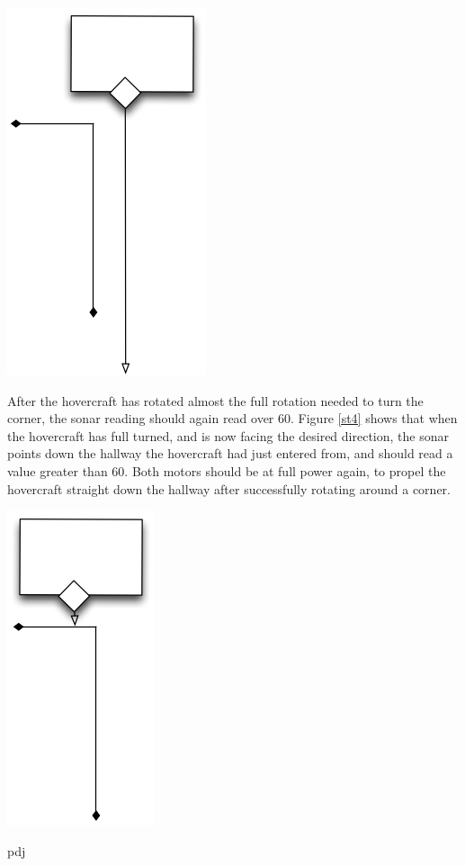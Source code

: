 \begin{center}
 \includegraphics[scale=0.5]{imageSources/sonarturn4.png}
\end{center}
\label{st4}

After the hovercraft has rotated almost the full rotation needed to turn the corner, the sonar reading should again read over 60. Figure \ref{st4} shows that when the hovercraft has full turned, and is now facing the desired direction, the sonar points down the hallway the hovercraft had just entered from, and should read a value greater than 60. Both motors should be at full power again, to propel the hovercraft straight down the hallway after successfully rotating around a corner. 
\begin{center}

 \includegraphics[scale=0.5]{imageSources/sonarturn5.png}
\end{center}
pdj
\label{st5}

